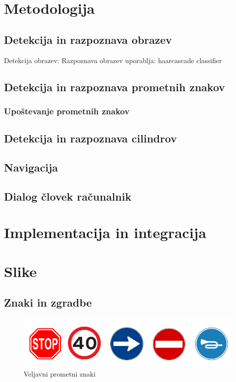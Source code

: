\documentclass[a4paper,11pt]{article}
\begin{document}

\section{Metodologija}
\subsection{Detekcija in razpoznava obrazev}

Detekcija obrazev: 
Razpoznava obrazev uporablja: haarcascade classifier

\subsection{Detekcija in razpoznava prometnih znakov}
\subsubsection{Upoštevanje prometnih znakov}
\subsection{Detekcija in razpoznava cilindrov}
\subsection{Navigacija}
\subsection{Dialog človek računalnik}


\section{Implementacija in integracija}


\appendix
\appendixpage
\section{\label{sec:slike} Slike}
\subsection{Znaki in zgradbe}
\begin{figure}[htbp]
\begin{center}
\includegraphics[width=\textwidth, scale=0.8]{signs.png}
\caption{Veljavni prometni znaki}
\label{slika1}
\end{center}
\end{figure}
\end{document}
